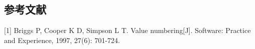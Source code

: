 \subsection*{参考文献}

[1] Briggs P, Cooper K D, Simpson L T. Value numbering[J]. Software: Practice and Experience, 1997, 27(6): 701-724.
